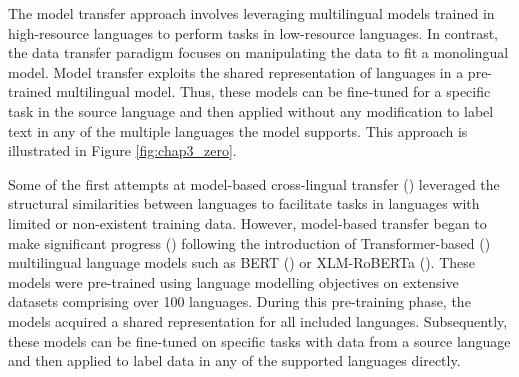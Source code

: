 The model transfer approach involves leveraging multilingual models trained in high-resource languages to perform tasks in low-resource languages. In contrast, the data transfer paradigm focuses on manipulating the data to fit a monolingual model. Model transfer exploits the shared representation of languages in a pre-trained multilingual model. Thus, these models can be fine-tuned for a specific task in the source language and then applied without any modification to label text in any of the multiple languages the model supports. This approach is illustrated in Figure \ref{fig:chap3_zero}.


Some of the first attempts at model-based cross-lingual transfer (\cite{tackstrom-etal-2012-cross,kozhevnikov-titov-2014-cross,bharadwaj-etal-2016-phonologically,chaudhary-etal-2018-adapting}) leveraged the structural similarities between languages to facilitate tasks in languages with limited or non-existent training data. However, model-based transfer began to make significant progress (\cite{artetxe-schwenk-2019-massively,pires-etal-2019-multilingual}) following the introduction of Transformer-based (\cite{DBLP:conf/nips/VaswaniSPUJGKP17}) multilingual language models such as BERT (\cite{devlin-etal-2019-bert}) or XLM-RoBERTa (\cite{conneau-etal-2020-unsupervised}). These models were pre-trained using language modelling objectives on extensive datasets comprising over 100 languages. During this pre-training phase, the models acquired a shared representation for all included languages. Subsequently, these models can be fine-tuned on specific tasks with data from a source language and then applied to label data in any of the supported languages directly.

